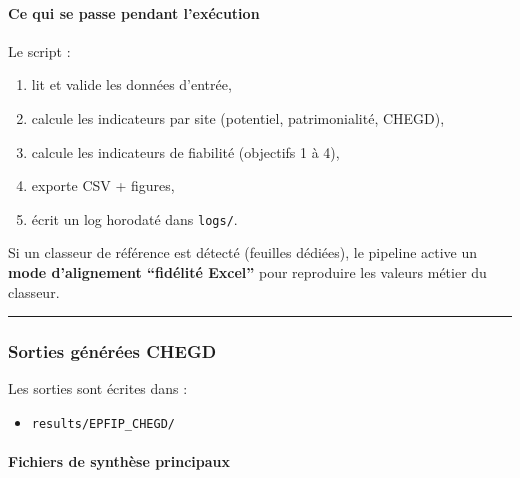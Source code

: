 \paragraph{Ce qui se passe pendant
l'exécution}\label{ce-qui-se-passe-pendant-lexuxe9cution}

Le script :

\begin{enumerate}
\def\labelenumi{\arabic{enumi}.}
\tightlist
\item
  lit et valide les données d'entrée,
\item
  calcule les indicateurs par site (potentiel, patrimonialité, CHEGD),
\item
  calcule les indicateurs de fiabilité (objectifs 1 à 4),
\item
  exporte CSV + figures,
\item
  écrit un log horodaté dans \texttt{logs/}.
\end{enumerate}

Si un classeur de référence est détecté (feuilles dédiées), le pipeline
active un \textbf{mode d'alignement ``fidélité Excel''} pour reproduire
les valeurs métier du classeur.

\begin{center}\rule{0.5\linewidth}{0.5pt}\end{center}

\subsubsection{Sorties générées
CHEGD}\label{sorties-guxe9nuxe9ruxe9es-chegd}

Les sorties sont écrites dans :

\begin{itemize}
\tightlist
\item
  \texttt{results/EPFIP\_CHEGD/}
\end{itemize}

\paragraph{Fichiers de synthèse
principaux}\label{fichiers-de-synthuxe8se-principaux}

